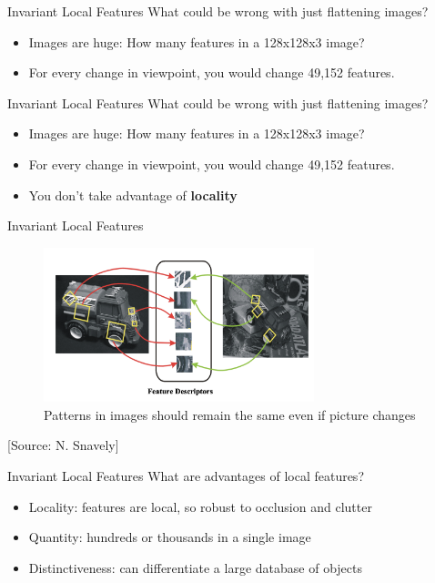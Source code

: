 \begin{frame}{Invariant Local Features}
What could be wrong with just flattening images?
\begin{itemize}
    \item Images are huge: How many features in a 128x128x3 image?
    \item For every change in viewpoint, you would change 49,152 features.
\end{itemize}
\end{frame}

\begin{frame}{Invariant Local Features}
What could be wrong with just flattening images?
\begin{itemize}
    \item Images are huge: How many features in a 128x128x3 image?
    \item For every change in viewpoint, you would change 49,152 features.
    \item You don't take advantage of \textbf{locality}
\end{itemize}
\end{frame}

\begin{frame}{Invariant Local Features}
\begin{figure}
    \centering
    \includegraphics[width=0.7\textwidth]{img/invariantlocal.png}
    \caption{Patterns in images should remain the same even if picture changes}
\end{figure}
[Source: N. Snavely]
\end{frame}

\begin{frame}{Invariant Local Features}
    What are advantages of local features?
    \begin{itemize}
        \item Locality: features are local, so robust to occlusion and clutter
        \item Quantity: hundreds or thousands in a single image
        \item Distinctiveness: can differentiate a large database of objects
    \end{itemize}
\end{frame}


